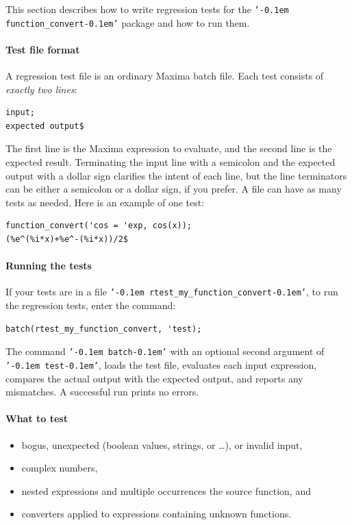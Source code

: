 \documentclass[12pt,fleqn]{extarticle}
\newcommand{\ttq}[1]{\texttt{'\kern-0.1em #1\kern-0.1em'}}
\newenvironment{maximabox}
  {\begin{tcolorbox}[
      breakable,
      enhanced,
      colback=white,
      colframe=black!8,
      boxrule=0pt,
      borderline west={2.2pt}{0pt}{black!25},
      arc=1pt,
      left=11pt,
      right=7pt,
      top=9pt,
      bottom=9pt,
      before skip=14pt,
      after skip=14pt
    ]}
  {\end{tcolorbox}}
\begin{document}
This section describes how to write regression tests for the \ttq{function\_convert} package 
and how to run them. 

\paragraph{Test file format} A regression test file is an ordinary Maxima batch file.  
Each test consists of \emph{exactly two lines}:
\begin{maximabox}
\begin{verbatim}
input;
expected output$
\end{verbatim}
\end{maximabox}
\noindent
The first line is the Maxima expression to evaluate, and the second line is the expected result.
Terminating the input line with a semicolon and the expected output with a dollar sign clarifies
the intent of each line, but the line terminators can be either a semicolon or a dollar sign, if you
prefer. A file can have as many tests as needed. Here is an example of one test:
\begin{maximabox}
\begin{verbatim}
function_convert('cos = 'exp, cos(x));
(%e^(%i*x)+%e^-(%i*x))/2$
\end{verbatim}
\end{maximabox}

\paragraph{Running the tests} If your tests are in a file \ttq{rtest\_my\_function\_convert}, to run the regression tests, enter the command:
\begin{maximabox}
\begin{verbatim}
batch(rtest_my_function_convert, 'test);
\end{verbatim}
\end{maximabox}
\noindent The command \ttq{batch} with an optional second argument of \ttq{test}, loads the test file, evaluates each input expression, compares the actual output with the expected output, and reports any mismatches.   A successful run prints no errors.

\paragraph{What to test} 

\begin{itemize}
\item bogus, unexpected (boolean values, strings, or \dots),  or invalid input,
  \item complex numbers,
  \item nested expressions and multiple occurrences the source function, and
  \item  converters applied to expressions containing unknown functions.
\end{itemize}
\end{document}
